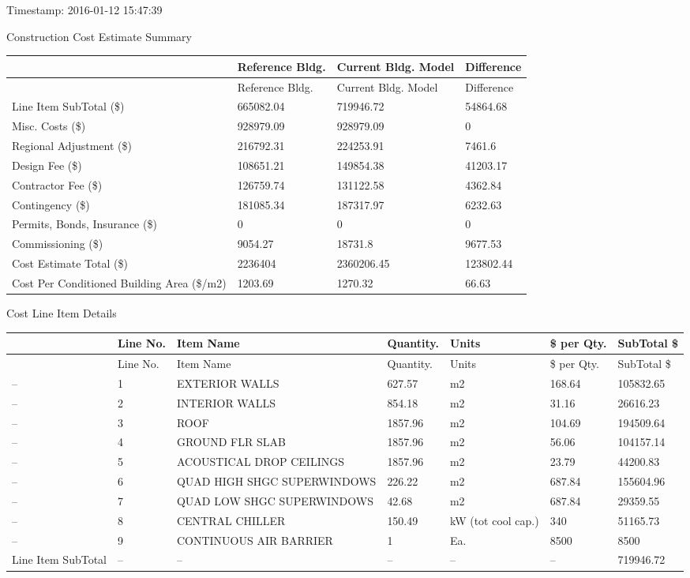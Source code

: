 Timestamp: 2016-01-12 15:47:39

Construction Cost Estimate Summary

\begin{longtable}[c]{>{\raggedright}p{1.5in}>{\raggedright}p{1.5in}>{\raggedright}p{1.5in}>{\raggedright}p{1.5in}}
\toprule 
 & Reference Bldg. & Current Bldg. Model & Difference \tabularnewline
\midrule
\endfirsthead

\toprule 
 & Reference Bldg. & Current Bldg. Model & Difference \tabularnewline
\midrule
\endhead

Line Item SubTotal (\$) & 665082.04 & 719946.72 & 54864.68 \tabularnewline
Misc. Costs (\$) & 928979.09 & 928979.09 & 0 \tabularnewline
Regional Adjustment (\$) & 216792.31 & 224253.91 & 7461.6 \tabularnewline
Design Fee (\$) & 108651.21 & 149854.38 & 41203.17 \tabularnewline
Contractor Fee (\$) & 126759.74 & 131122.58 & 4362.84 \tabularnewline
Contingency (\$) & 181085.34 & 187317.97 & 6232.63 \tabularnewline
Permits, Bonds, Insurance (\$) & 0 & 0 & 0 \tabularnewline
Commissioning (\$) & 9054.27 & 18731.8 & 9677.53 \tabularnewline
Cost Estimate Total (\$) & 2236404 & 2360206.45 & 123802.44 \tabularnewline
Cost Per Conditioned Building Area (\$/m2) & 1203.69 & 1270.32 & 66.63 \tabularnewline
\bottomrule
\end{longtable}

Cost Line Item Details

\begin{longtable}[c]{>{\raggedright}p{0.85in}>{\raggedright}p{0.85in}>{\raggedright}p{0.85in}>{\raggedright}p{0.85in}>{\raggedright}p{0.85in}>{\raggedright}p{0.85in}>{\raggedright}p{0.85in}}
\toprule 
 & Line No. & Item Name & Quantity. & Units & \$ per Qty. & SubTotal \$ \tabularnewline
\midrule
\endfirsthead

\toprule 
 & Line No. & Item Name & Quantity. & Units & \$ per Qty. & SubTotal \$ \tabularnewline
\midrule
\endhead

-- & 1 & EXTERIOR WALLS & 627.57 & m2 & 168.64 & 105832.65 \tabularnewline
-- & 2 & INTERIOR WALLS & 854.18 & m2 & 31.16 & 26616.23 \tabularnewline
-- & 3 & ROOF & 1857.96 & m2 & 104.69 & 194509.64 \tabularnewline
-- & 4 & GROUND FLR SLAB & 1857.96 & m2 & 56.06 & 104157.14 \tabularnewline
-- & 5 & ACOUSTICAL DROP CEILINGS & 1857.96 & m2 & 23.79 & 44200.83 \tabularnewline
-- & 6 & QUAD HIGH SHGC SUPERWINDOWS & 226.22 & m2 & 687.84 & 155604.96 \tabularnewline
-- & 7 & QUAD LOW SHGC SUPERWINDOWS & 42.68 & m2 & 687.84 & 29359.55 \tabularnewline
-- & 8 & CENTRAL CHILLER & 150.49 & kW (tot cool cap.) & 340 & 51165.73 \tabularnewline
-- & 9 & CONTINUOUS AIR BARRIER & 1 & Ea. & 8500 & 8500 \tabularnewline
Line Item SubTotal & -- & -- & -- & -- & -- & 719946.72 \tabularnewline
\bottomrule
\end{longtable}

